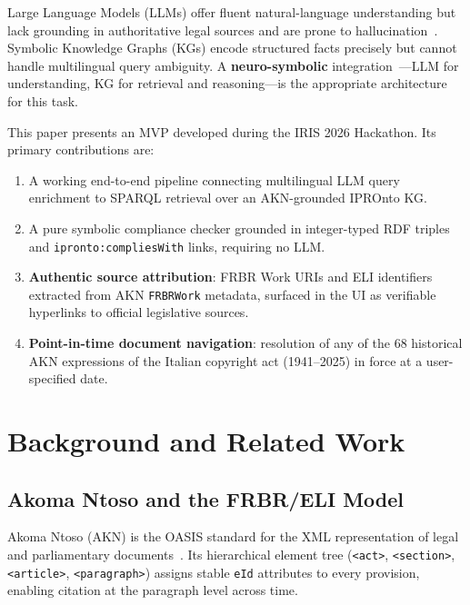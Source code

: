 \documentclass[12pt,a4paper]{article}
\begin{document}
Large Language Models (LLMs) offer fluent natural-language understanding
but lack grounding in authoritative legal sources and are prone to
hallucination~\cite{huang2023}. Symbolic Knowledge Graphs (KGs) encode
structured facts precisely but cannot handle multilingual query ambiguity.
A \textbf{neuro-symbolic} integration~\cite{hitzler2022}---LLM for
understanding, KG for retrieval and reasoning---is the appropriate
architecture for this task.

This paper presents an MVP developed during the IRIS 2026 Hackathon. Its
primary contributions are:
\begin{enumerate}[leftmargin=1.4em]
  \item A working end-to-end pipeline connecting multilingual LLM query
        enrichment to SPARQL retrieval over an AKN-grounded IPROnto KG.
  \item A pure symbolic compliance checker grounded in integer-typed RDF
        triples and \texttt{ipronto:compliesWith} links, requiring no LLM.
  \item \textbf{Authentic source attribution}: FRBR Work URIs and ELI
        identifiers extracted from AKN \texttt{FRBRWork} metadata, surfaced
        in the UI as verifiable hyperlinks to official legislative sources.
  \item \textbf{Point-in-time document navigation}: resolution of any of the
        68 historical AKN expressions of the Italian copyright act
        (1941--2025) in force at a user-specified date.
\end{enumerate}

\section{Background and Related Work}

\subsection{Akoma Ntoso and the FRBR/ELI Model}

Akoma Ntoso (AKN) is the OASIS standard for the XML representation of
legal and parliamentary documents~\cite{oasis2018,palmirani2011}. Its
hierarchical element tree (\texttt{<act>}, \texttt{<section>},
\texttt{<article>}, \texttt{<paragraph>}) assigns stable \texttt{eId}
attributes to every provision, enabling citation at the paragraph level
across time.
\end{document}
